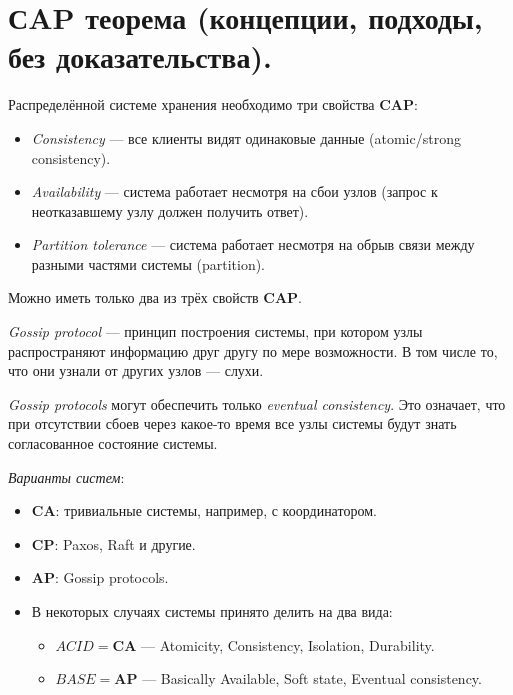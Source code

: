 \section{СAP теорема (концепции, подходы, без доказательства).}

\begin{definition}
    Распределённой системе хранения необходимо
    три свойства \textbf{CAP}:

    \begin{itemize}
        \item \textit{Consistency} --- все клиенты видят одинаковые данные
            (atomic/strong consistency).
        \item \textit{Availability} --- система работает несмотря на сбои узлов
            (запрос к неотказавшему узлу должен получить ответ).
        \item \textit{Partition tolerance} --- система работает несмотря на обрыв
            связи между разными частями системы (partition).
    \end{itemize}
\end{definition}

\begin{theorem}
    Можно иметь только два из трёх свойств \textbf{CAP}.
\end{theorem}

\begin{definition}
    \textit{Gossip protocol} --- принцип построения системы, при котором
    узлы распространяют информацию друг другу по мере возможности.
    В том числе то, что они узнали от других узлов --- слухи.
\end{definition}

\begin{remark}
    \textit{Gossip protocols} могут обеспечить только \textit{eventual consistency}.
    Это означает, что при отсутствии сбоев через какое-то время все узлы системы
    будут знать согласованное состояние системы.
\end{remark}

\begin{examples} \textit{Варианты систем}:
    \begin{itemize}
        \item \textbf{CA}: тривиальные системы, например, с координатором.
        \item \textbf{CP}: Paxos, Raft и другие.
        \item \textbf{AP}: Gossip protocols.
        \item В некоторых случаях системы принято делить на два вида:
            \begin{itemize}
                \item $ACID = \textbf{CA}$ --- Atomicity, Consistency,
                    Isolation, Durability.
                \item $BASE = \textbf{AP}$ --- Basically Available, Soft state,
                    Eventual consistency.
            \end{itemize}
    \end{itemize}
\end{examples}